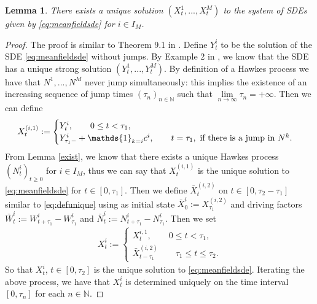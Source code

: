 \documentclass[10pt]{article}
\theoremstyle{plain}
\newtheorem{lemma}[theorem]{Lemma}                              %
\theoremstyle{definition}
\newcommand{\<}{\langle}
\renewcommand{\>}{\rangle}
\renewcommand{\(}{\left(}
\renewcommand{\)}{\right)}
\renewcommand{\[}{\left[}
\renewcommand{\]}{\right]}
\def \caratt {{\mathds{1}}}
\newcommand{\blu}[1]{\textcolor{blue}{#1}}
\begin{document}
\begin{lemma} There exists a unique solution $(X_t^1,...,X_t^M)$ to the system of SDEs given by \eqref{eq:meanfieldsde} for $i\in  I_{M}$.
\end{lemma}
\begin{proof}
The proof is similar to Theorem 9.1 in \citet{ikeda81}. Define $Y_t^i$ to be the solution of
the
SDE \eqref{eq:meanfieldsde} without jumps.
By Example 2 in \citet{cox95}, we know that the SDE has a unique strong solution
$(Y_t^1,...,Y_t^M)$. By definition of a Hawkes process we have that $N^1,...,N^M$ never jump
simultaneously: this implies the existence of an increasing sequence of jump times $(\tau_n)_{n\in
\mathbb{N}}$ such that %
$\lim\limits_{n\rightarrow\infty}\tau_n=+\infty$. Then we can define
\begin{align}\label{eq:defunique}
X_t^{(i,1)}:=\begin{cases} Y_t^i, \qquad 0\leq t< \tau_1,\\ Y_{\tau_1-}^i+\caratt_{k=i}c^i, \qquad
t=\tau_1, \textnormal{ if there is a jump in } N^k.
\end{cases}
\end{align}
From Lemma \ref{exist}, we know that there exists a unique Hawkes process $(N_t^i)_{t\geq 0}$ for
$i\in I_{M}$, thus we can say that $X_t^{(i,1)}$ is the unique solution to \eqref{eq:meanfieldsde}
for $t\in[0,\tau_1]$. Then we define $\bar X_t^{(i,2)}$ on $t\in [0,\tau_2-\tau_1]$ similar to
\eqref{eq:defunique} using as initial state $\bar X_0^i:=X_{\tau_1}^{(i,2)}$ and driving factors
$\bar W_t^i:=W_{t+\tau_{1}}^i-W_{\tau_{1}}^i$ and $\bar N_t^i:= N_{t+\tau_{1}}^i-N_{\tau_{1}}^i$.
Then we set
\begin{align}
X_t^{i}:=\begin{cases} X_t^{i,1}, \qquad 0\leq t < \tau_1,\\ \bar X_{t-\tau_1}^{(i,2)} \qquad
\tau_1\leq t\leq \tau_2.
\end{cases}
\end{align}
So that $X_t^i$, $t\in [0,\tau_2]$ is the unique solution to \eqref{eq:meanfieldsde}. Iterating the above process, we have that $X_t^i$ is determined uniquely on the time interval $[0,\tau_n]$ for each $n\in\mathbb{N}$.
\end{proof}
\end{document}
